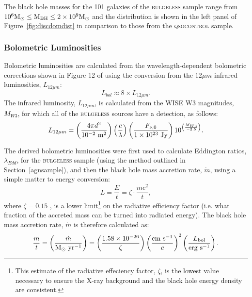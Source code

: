 {The black hole masses for the 101 galaxies of the \textsc{bulgeless} sample range from {\notebsm $10^6 \rm{M}_{\odot} \leq M_{\rm BH} \leq 2 \times 10^9 \rm{M}_{\odot}$} and the distribution is shown in the left panel of Figure~\ref{fig:discdomdist} in comparison to those from the \textsc{qsocontrol} sample. 

\subsubsection{Bolometric Luminosities}\label{sec:eddratios}

Bolometric luminosities are calculated from the wavelength-dependent bolometric corrections shown in Figure 12 of \citet{richards06} using the conversion from the $12\mu m$ infrared luminosities, $ L_{12\mu m}$:
\begin{equation}
L_{bol} \approx 8 \times L_{12\mu m}.
\end{equation}
The infrared luminosity,  $L_{12\mu m}$, is calculated from the WISE W3 magnitudes, $M_{W3}$, for which all of the \textsc{bulgeless} sources have a detection, as follows:
\begin{equation}
L_{12\mu m} = \left(\frac{4\pi d^2}{10^{-2}~\rm{m}^2}\right)\left( \frac{c}{\lambda}\right) \left(\frac{F_{\nu, 0}}{1\times10^{23}~ \rm{Jy}} \right)10^{\left(\frac{M_{W3}}{-2.5}\right)}.
\end{equation}

The derived bolometric luminosities were first used to calculate Eddington ratios, $\lambda_{Edd}$, for the \textsc{bulgeless} sample (using the method outlined in Section~\ref{agnsample}), and then the black hole mass accretion rate, $\dot{m}$, using a simple matter to energy conversion:
\begin{equation}\label{eq:ltomdot}
L = \frac{E}{t} = \zeta\cdot \frac{mc^2}{t},
\end{equation}
where $\zeta =0.15$ \citep{elvis02}, is a lower limit\footnote{This estimate of the radiative effeciency factor, $\zeta$, is the lowest value necessary to ensure the X-ray background and the black hole energy density are consistent.} on the radiative efficiency factor (i.e. what fraction of the accreted mass can be turned into radiated energy). The black hole mass accretion rate, $\dot{m}$ is therefore calculated as:
\begin{equation}\label{eq:mdot}
\frac{m}{t} = \left(\frac{\dot{m}}{\rm{M}_{\odot}~\rm{yr}^{-1}}\right) = \left( \frac{1.58\times 10^{-26}}{\zeta} \right) \left( \frac{\rm{cm}~\rm{s}^{-1}}{c} \right)^2 \left( \frac{L_{\rm{bol}}}{\rm{erg}~\rm{s}^{-1}} \right).
\end{equation}


}
